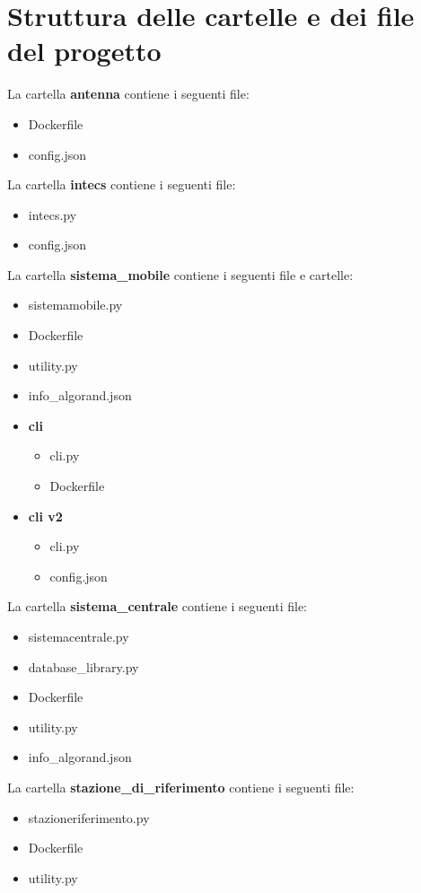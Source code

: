 \section{Struttura delle cartelle e dei file del progetto}
La cartella \textbf{antenna} contiene i seguenti file:
\begin{itemize}
    \item Dockerfile
    \item config.json
\end{itemize}
La cartella \textbf{intecs} contiene i seguenti file:
\begin{itemize} 
    \item intecs.py 
    \item config.json 
\end{itemize}
La cartella \textbf{sistema\_mobile} contiene i seguenti file e cartelle:
\begin{itemize}
    \item sistemamobile.py 
    \item Dockerfile 
    \item utility.py 
    \item info\_algorand.json
    \item \textbf{cli}
        \begin{itemize}
            \item cli.py
            \item Dockerfile
        \end{itemize}
    \item \textbf{cli v2}
        \begin{itemize}
            \item cli.py 
            \item config.json 
        \end{itemize}
\end{itemize}
La cartella \textbf{sistema\_centrale} contiene i seguenti file:
\begin{itemize}
    \item sistemacentrale.py 
    \item database\_library.py 
    \item Dockerfile 
    \item utility.py 
    \item info\_algorand.json 
\end{itemize}
La cartella \textbf{stazione\_di\_riferimento} contiene i seguenti file:
\begin{itemize}
    \item stazioneriferimento.py 
    \item Dockerfile 
    \item utility.py 
\end{itemize}

